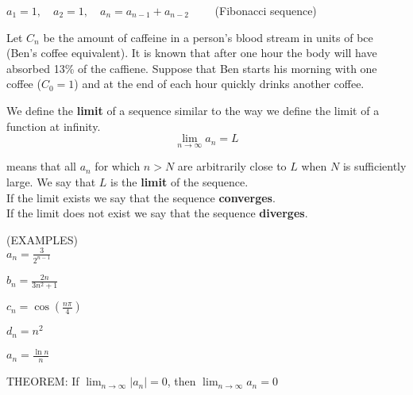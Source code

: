 \documentclass[11pt]{article}
\begin{document}
\vspace{2in}


$a_1= 1, \quad a_2=1, \quad a_n= a_{n-1}+a_{n-2} \quad\quad$  (Fibonacci sequence)


\vspace{2in}

Let $C_n$ be the amount of caffeine in a person's blood stream in units of bce (Ben's coffee equivalent).  It is known that after
one hour the body will have absorbed 13\% of the caffiene.  Suppose that Ben starts his morning with one coffee ($C_0 = 1$) and at the end of each hour quickly drinks another coffee.

\pagebreak

We define the {\bf limit} of a sequence similar to the way we define the limit of a function at infinity.\\

\begin{displaymath}
  \lim_{n\to \infty}a_n = L
\end{displaymath}

means that all $a_n$ for which $n > N$ are arbitrarily close to $L$ when $N$ is sufficiently large.  We say  that $L$ is the {\bf limit} of the sequence.\\

If the limit exists we say that the sequence {\bf converges}. \\
If the limit does not exist we say that the sequence {\bf diverges}.


\vspace{.5in}

(EXAMPLES)\\

$a_n=\frac{3}{2^{n-1}}$

\vspace{.7in}


$b_n=\frac{2n}{3n^2+1}$

\vspace{.7in}

$c_n=\cos{\left(\frac{n\pi}{4}\right)}$

\vspace{.7in}

$d_n=n^2$

\vspace{.7in}

$a_n=\frac{\ln{n}}{n}$




\pagebreak

THEOREM:  If $\lim_{n\to\infty}|a_n| = 0$, then $\lim_{n\to\infty}a_n = 0$\\
\end{document}
